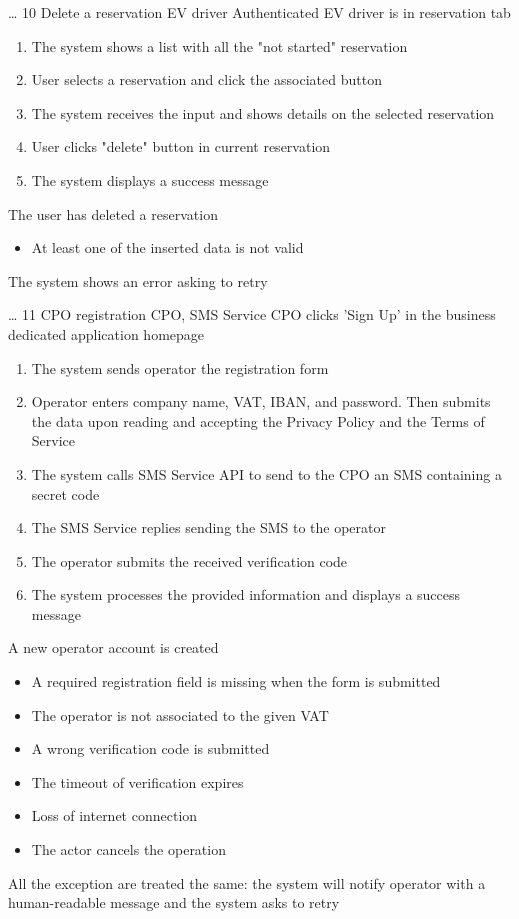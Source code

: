 \usecase
{
    \dots %
}
{10}
{Delete a reservation}
{EV driver}
{Authenticated EV driver is in reservation tab}
{
    \begin{enumerate}
        \item The system shows a list with all the "not started" reservation
        \item User selects a reservation and click the associated button
        \item The system receives the input and shows details on the selected reservation
        \item User clicks "delete" button in current reservation
        \item The system displays a success message
    \end{enumerate}
}
{The user has deleted a reservation}
{
    \begin{itemize}
        \item At least one of the inserted data is not valid
    \end{itemize}
}
{
    The system shows an error asking to retry
}


\usecase
{
    \dots %
}
{11}
{CPO registration} %
{CPO, SMS Service} %
{CPO clicks 'Sign Up' in the business dedicated application homepage} %
{ %
    \begin{enumerate}
        \item The system sends operator the registration form
        \item Operator enters company name, VAT, IBAN, and password. Then submits the data upon reading and accepting the Privacy Policy and the Terms of Service
        \item The system calls SMS Service API to send to the CPO an SMS containing a secret code
        \item The SMS Service replies sending the SMS to the operator
        \item The operator submits the received verification code
        \item The system processes the provided information and displays a success message
    \end{enumerate}
}
{A new operator account is created} %
{ %
    \begin{itemize}
        \item A required registration field is missing when the form is submitted
        \item The operator is not associated to the given VAT
        \item A wrong verification code is submitted
        \item The timeout of verification expires
        \item Loss of internet connection
        \item The actor cancels the operation
    \end{itemize}
}
{ %
    All the exception are treated the same: the system will notify operator with a human-readable message and the system asks to retry
}

